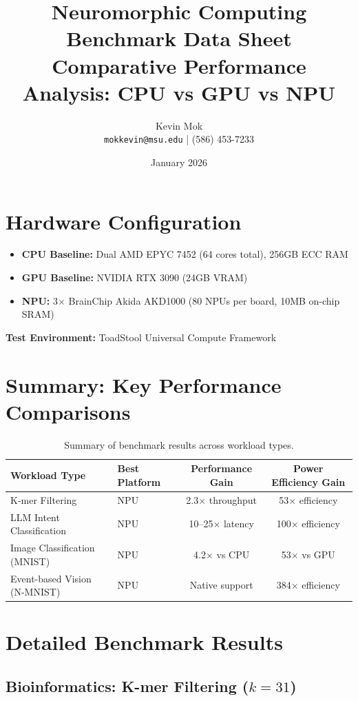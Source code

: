 \documentclass[11pt,a4paper]{article}
\title{\textbf{Neuromorphic Computing Benchmark Data Sheet}\\
\large Comparative Performance Analysis: CPU vs GPU vs NPU}
\author{Kevin Mok\\
\texttt{mokkevin@msu.edu} | (586) 453-7233}
\date{January 2026}
\begin{document}
\maketitle

\section*{Hardware Configuration}

\begin{itemize}[leftmargin=*]
    \item \textbf{CPU Baseline:} Dual AMD EPYC 7452 (64 cores total), 256GB ECC RAM
    \item \textbf{GPU Baseline:} NVIDIA RTX 3090 (24GB VRAM)
    \item \textbf{NPU:} 3$\times$ BrainChip Akida AKD1000 (80 NPUs per board, 10MB on-chip SRAM)
\end{itemize}

\noindent\textbf{Test Environment:} ToadStool Universal Compute Framework

\section{Summary: Key Performance Comparisons}

\begin{table}[h]
\centering
\begin{tabular}{@{}llcc@{}}
\toprule
\textbf{Workload Type} & \textbf{Best Platform} & \textbf{Performance Gain} & \textbf{Power Efficiency Gain} \\
\midrule
K-mer Filtering & NPU & 2.3$\times$ throughput & 53$\times$ efficiency \\
LLM Intent Classification & NPU & 10--25$\times$ latency & 100$\times$ efficiency \\
Image Classification (MNIST) & NPU & 4.2$\times$ vs CPU & 53$\times$ vs GPU \\
Event-based Vision (N-MNIST) & NPU & Native support & 384$\times$ efficiency \\
\bottomrule
\end{tabular}
\caption{Summary of benchmark results across workload types.}
\end{table}

\section{Detailed Benchmark Results}

\subsection{Bioinformatics: K-mer Filtering ($k=31$)}
\end{document}
